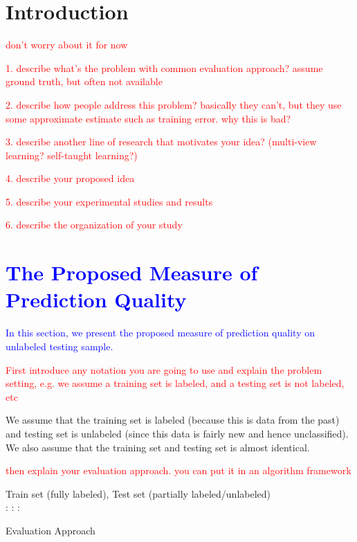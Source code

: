 \documentclass[a4paper,conference]{IEEEtran}
\begin{document}
\IEEEpeerreviewmaketitle



\section{Introduction}

\textcolor{red}{don't worry about it for now}

\textcolor{red}{1. describe what's the problem with common 
evaluation approach? assume ground truth, but often not available}

\textcolor{red}{2. describe how people address this problem? 
basically they can't, but they use some approximate estimate 
such as training error. why this is bad?}

\textcolor{red}{3. describe another line of research that motivates 
your idea? (multi-view learning? self-taught learning?)}

\textcolor{red}{4. describe your proposed idea}


\textcolor{red}{5. describe your experimental studies and results}


\textcolor{red}{6. describe the organization of your study}


\section{\textcolor{blue}{The Proposed Measure of Prediction Quality}} 

\textcolor{blue}{In this section, we present the proposed 
measure of prediction quality on unlabeled testing sample.} 

\textcolor{red}{ First introduce any notation you are going to use 
and explain the problem setting, e.g. we assume a training 
set is labeled, and a testing set is not labeled, etc}

We assume that the training set is labeled (because this is data from the past) and testing set is unlabeled (since this data is fairly new and hence unclassified). We also assume that the training set and testing set is almost identical.


\textcolor{red}{then explain your evaluation approach. you can put it 
in an algorithm framework} 

\begin{algorithm}[t!]
\begin{algorithmic}
    Train set (fully labeled), Test set (partially labeled/unlabeled)\\   
   	   : 
       :
	   : 
   \ENDFOR
   \vskip -0.2in
\end{algorithmic}
   \caption{Evaluation Approach}
\label{alg1}
\end{algorithm}
\end{document}
